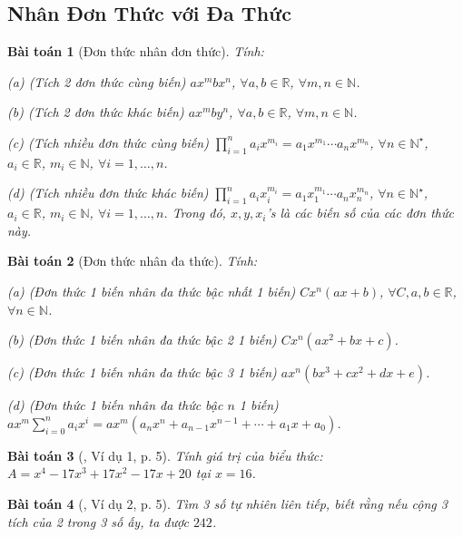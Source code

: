 \documentclass{article}
\numberwithin{equation}{section}
\newtheorem{baitoan}{Bài toán}[section]
\begin{document}
\subsection{Nhân Đơn Thức với Đa Thức}
\begin{baitoan}[Đơn thức nhân đơn thức]
	Tính:
	\begin{enumerate*}
		\item[(a)] \emph{(Tích 2 đơn thức cùng biến)} $ax^mbx^n$, $\forall a,b\in\mathbb{R}$, $\forall m,n\in\mathbb{N}$.
		\item[(b)] \emph{(Tích 2 đơn thức khác biến)} $ax^mby^n$, $\forall a,b\in\mathbb{R}$, $\forall m,n\in\mathbb{N}$.
		\item[(c)] \emph{(Tích nhiều đơn thức cùng biến)} $\prod_{i=1}^n a_ix^{m_i} = a_1x^{m_1}\cdots a_nx^{m_n}$, $\forall n\in\mathbb{N}^\star$, $a_i\in\mathbb{R}$, $m_i\in\mathbb{N}$, $\forall i = 1,\ldots,n$.
		\item[(d)] \emph{(Tích nhiều đơn thức khác biến)} $\prod_{i=1}^n a_ix_i^{m_i} = a_1x_1^{m_1}\cdots a_nx_n^{m_n}$, $\forall n\in\mathbb{N}^\star$, $a_i\in\mathbb{R}$, $m_i\in\mathbb{N}$, $\forall i = 1,\ldots,n$. Trong đó, $x,y,x_i$'s là các biến số của các đơn thức này.
	\end{enumerate*}
\end{baitoan}

\begin{baitoan}[Đơn thức nhân đa thức]
	Tính:
	\begin{enumerate*}
		\item[(a)] \emph{(Đơn thức 1 biến nhân đa thức bậc nhất 1 biến)} $Cx^n(ax + b)$, $\forall C,a,b\in\mathbb{R}$, $\forall n\in\mathbb{N}$.
		\item[(b)] \emph{(Đơn thức 1 biến nhân đa thức bậc 2 1 biến)} $Cx^n(ax^2 + bx + c)$.
		\item[(c)] \emph{(Đơn thức 1 biến nhân đa thức bậc 3 1 biến)} $ax^n(bx^3 + cx^2 + dx + e)$.
		\item[(d)] \emph{(Đơn thức 1 biến nhân đa thức bậc $n$ 1 biến)} $ax^m\sum_{i=0}^n a_ix^i = ax^m(a_nx^n + a_{n-1}x^{n-1} + \cdots + a_1x + a_0)$.
	\end{enumerate*}
\end{baitoan}

\begin{baitoan}[\cite{Binh_Toan_8_tap_1}, Ví dụ 1, p. 5]
	Tính giá trị của biểu thức: $A = x^4 - 17x^3 + 17x^2 - 17x + 20$ tại $x = 16$.
\end{baitoan}

\begin{baitoan}[\cite{Binh_Toan_8_tap_1}, Ví dụ 2, p. 5]
	Tìm 3 số tự nhiên liên tiếp, biết rằng nếu cộng 3 tích của 2 trong 3 số ấy, ta được $242$.
\end{baitoan}
\end{document}
